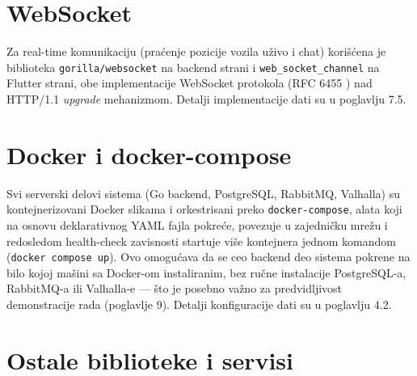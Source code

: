 \section{WebSocket}

Za real-time komunikaciju (praćenje pozicije vozila uživo i chat) korišćena je biblioteka \texttt{gorilla/websocket} na backend strani i \texttt{web\_socket\_channel} na Flutter strani, obe implementacije WebSocket protokola (RFC 6455 \cite{websocket}) nad HTTP/1.1 \emph{upgrade} mehanizmom. Detalji implementacije dati su u poglavlju 7.5.

\section{Docker i docker-compose}

Svi serverski delovi sistema (Go backend, PostgreSQL, RabbitMQ, Valhalla) su kontejnerizovani Docker slikama \cite{docker} i orkestrisani preko \texttt{docker-compose}, alata koji na osnovu deklarativnog YAML fajla pokreće, povezuje u zajedničku mrežu i redosledom health-check zavisnosti startuje više kontejnera jednom komandom (\texttt{docker compose up}). Ovo omogućava da se ceo backend deo sistema pokrene na bilo kojoj mašini sa Docker-om instaliranim, bez ručne instalacije PostgreSQL-a, RabbitMQ-a ili Valhalla-e — što je posebno važno za predvidljivost demonstracije rada (poglavlje 9). Detalji konfiguracije dati su u poglavlju 4.2.

\section{Ostale biblioteke i servisi}

